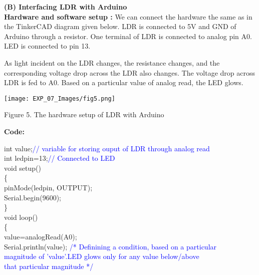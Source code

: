 \documentclass[12pt,a4paper]{article}
\begin{document}
\setlength{\parindent}{0pt}

\begin{justify}
\textbf{(B) Interfacing LDR with Arduino}\\[3pt]
\textbf{Hardware and software setup :} We can connect the hardware the same as in the TinkerCAD diagram given below. LDR is connected to 5V and GND of Arduino through a resistor. One terminal of LDR is connected to analog pin A0. LED is connected to pin 13.\par
\noindent As light incident on the LDR changes, the resistance changes, and the corresponding voltage drop across the LDR also changes. The voltage drop across LDR is fed to A0. Based on a particular value of analog read, the LED glows.\end{justify}

\begin{center} 
\texttt{[image: EXP\_07\_Images/fig5.png]}
\end{center}
\begin{center} {Figure 5. The hardware setup of LDR with Arduino}\end{center}
\vspace{10mm}
\hspace{2cm}\textbf{\large Code:}\\[6pt]

\setlength{\parindent}{10eM}

int value;\hspace{12pt}\textcolor{blue}{// variable for storing ouput of LDR through analog read}\\
int ledpin=13;\hspace{12pt}\textcolor{blue}{// Connected to LED}\\

void setup()\\
\{\\
   pinMode(ledpin, OUTPUT);\\
 Serial.begin(9600);\\
\}\\
\vspace{20mm}
void loop()\\
\{\\
  value=analogRead(A0);\\
 Serial.println(value); \hspace{12pt}\textcolor{blue}{ /*  Definining a condition, based on a particular\\ magnitude of 'value'.LED glows only for any value below/above \\that particular magnitude  */}\\
\end{document}
